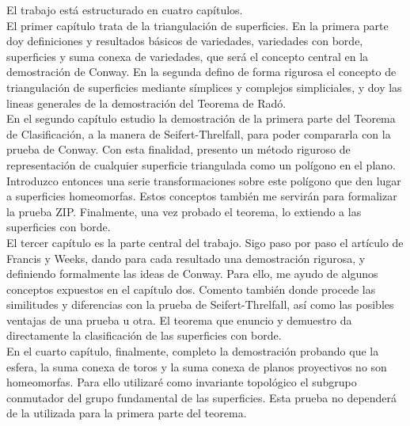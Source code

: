 \documentclass[10pt]{report}
\theoremstyle{definition}
\begin{document}
El trabajo está estructurado en cuatro capítulos.\\

El primer capítulo trata de la triangulación de superficies. En la primera parte doy definiciones y resultados básicos de variedades, variedades con borde, superficies y suma conexa de variedades, que será el concepto central en la demostración de Conway. En la segunda defino de forma rigurosa el concepto de triangulación de superficies mediante símplices y complejos simpliciales, y doy las lineas generales de la demostración del Teorema de Radó. \\ %

En el segundo capítulo estudio la demostración de la primera parte del Teorema de Clasificación, a la manera de Seifert-Threlfall, para poder compararla con la prueba de Conway. Con esta finalidad, presento un método riguroso de representación de cualquier superficie triangulada como un polígono en el plano. Introduzco entonces una serie transformaciones sobre este polígono que den lugar a superficies homeomorfas. Estos conceptos también me servirán para formalizar la prueba ZIP. Finalmente, una vez probado el teorema, lo extiendo a las superficies con borde.\\

El tercer capítulo es la parte central del trabajo. Sigo paso por paso el artículo de Francis y Weeks, dando para cada resultado una demostración rigurosa, y definiendo formalmente las ideas de Conway. Para ello, me ayudo de algunos conceptos expuestos en el capítulo dos. Comento también donde procede las similitudes y diferencias con la prueba de Seifert-Threlfall, así como las posibles ventajas de una prueba u otra. El teorema que enuncio y demuestro da directamente la clasificación de las superficies con borde.\\

En el cuarto capítulo, finalmente, completo la demostración probando que la esfera, la suma conexa de toros y la suma conexa de planos proyectivos no son homeomorfas. Para ello utilizaré como invariante topológico el subgrupo conmutador del grupo fundamental de las superficies. Esta prueba no dependerá de la utilizada para la primera parte del teorema. \\
\end{document}
